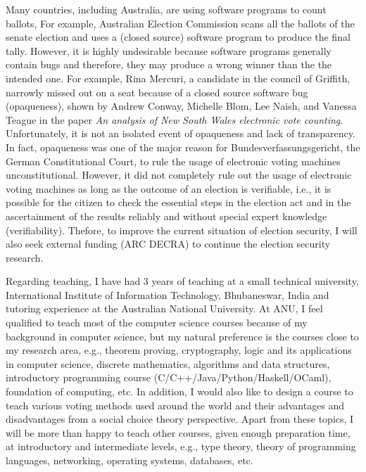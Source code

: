 \documentclass[11pt,a4paper,roman]{moderncv}
\begin{document}
\vspace{0.5cm}
Many countries, including Australia, are using software programs to count ballots, 
For example, Australian Election Commission 
scans all the ballots of the senate election and 
uses a (closed source) software program to produce the final tally. However, 
it is highly undesirable because software programs generally 
contain bugs and therefore, they may produce a wrong winner than 
the the intended one. For example, Rina Mercuri, a candidate in the council of Griffith,
narrowly missed out on a seat because of a closed source software bug (opaqueness), shown by 
Andrew Conway, Michelle Blom, Lee Naish, and Vanessa Teague in the paper 
\textit{An analysis of New South Wales electronic vote counting}.  Unfortunately, 
it is not an isolated event of opaqueness and lack of transparency. In fact,
opaqueness was one of the major reason for Bundesverfassungsgericht, the German Constitutional Court, 
to rule the usage of electronic voting machines unconstitutional. However, it did not 
completely rule out the usage of electronic voting machines as long as the outcome of an election 
is verifiable, i.e., it is possible for the citizen to check the essential steps in the 
election act and in the ascertainment of the results reliably and without special 
expert knowledge (verifiability). Thefore, to improve the current situation of election security, 
I will also seek external funding (ARC DECRA) to continue the 
election security research. 

\vspace{0.5cm}
Regarding teaching, I have had 3 years of teaching at a small technical university, 
International Institute of Information Technology, Bhubaneswar, India and 
tutoring experience at the Australian National University. At ANU, 
I feel qualified to teach most of the computer science courses 
because of my background in computer science, but 
my natural preference is the courses close to my research 
area, e.g., theorem proving, cryptography, logic 
and its applications in computer science, discrete 
mathematics, algorithms and data structures, 
introductory programming course (C/C++/Java/Python/Haskell/OCaml),
foundation of computing, etc. 
In addition, I would also like to design a course to teach 
various voting methods used around the world and 
their advantages and disadvantages from a social choice theory perspective. 
Apart from these topics, I will 
be more than happy to teach other courses, given enough 
preparation time, at introductory and 
intermediate levels, e.g., type theory, theory of programming 
languages, networking, operating systems, databases, etc.
\end{document}
